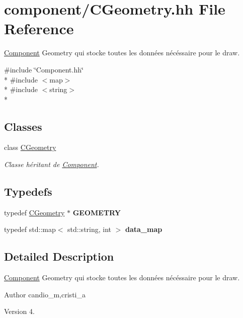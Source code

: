 \hypertarget{_c_geometry_8hh}{}\section{component/\+C\+Geometry.hh File Reference}
\label{_c_geometry_8hh}


\hyperlink{class_component}{Component} Geometry qui stocke toutes les données nécéssaire pour le draw.  


{\ttfamily \#include \char`\"{}Component.\+hh\char`\"{}}\\*
{\ttfamily \#include $<$map$>$}\\*
{\ttfamily \#include $<$string$>$}\\*
\subsection*{Classes}
\begin{DoxyCompactItemize}
\item 
class \hyperlink{class_c_geometry}{C\+Geometry}
\begin{DoxyCompactList}\small\item\em Classe héritant de \hyperlink{class_component}{Component}. \end{DoxyCompactList}\end{DoxyCompactItemize}
\subsection*{Typedefs}
\begin{DoxyCompactItemize}
\item 
\hypertarget{_c_geometry_8hh_ae0da79fb6189dde8527d2444127b74aa}{}typedef \hyperlink{class_c_geometry}{C\+Geometry} $\ast$ {\bfseries G\+E\+O\+M\+E\+T\+R\+Y}\label{_c_geometry_8hh_ae0da79fb6189dde8527d2444127b74aa}

\item 
\hypertarget{_c_geometry_8hh_a8e90179cd08b79c3c5e4c7dba6b3daca}{}typedef std\+::map$<$ std\+::string, int $>$ {\bfseries data\+\_\+map}\label{_c_geometry_8hh_a8e90179cd08b79c3c5e4c7dba6b3daca}

\end{DoxyCompactItemize}


\subsection{Detailed Description}
\hyperlink{class_component}{Component} Geometry qui stocke toutes les données nécéssaire pour le draw. 

\begin{DoxyAuthor}{Author}
candio\+\_\+m,cristi\+\_\+a 
\end{DoxyAuthor}
\begin{DoxyVersion}{Version}
4. 
\end{DoxyVersion}
